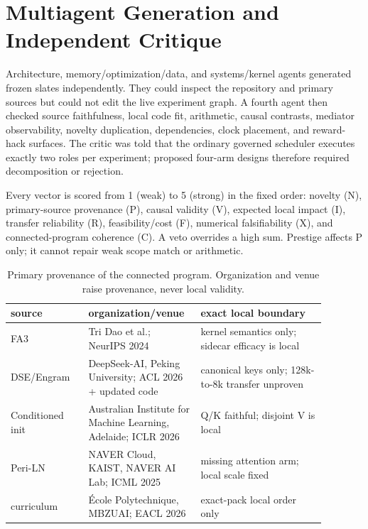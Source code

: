 \documentclass{article}
\begin{document}
\section{Multiagent Generation and Independent Critique}

Architecture, memory/optimization/data, and systems/kernel agents generated
frozen slates independently.  They could inspect the repository and primary
sources but could not edit the live experiment graph.  A fourth agent then
checked source faithfulness, local code fit, arithmetic, causal contrasts,
mediator observability, novelty duplication, dependencies, clock placement,
and reward-hack surfaces.  The critic was told that the ordinary governed
scheduler executes exactly two roles per experiment; proposed four-arm
designs therefore required decomposition or rejection.

Every vector is scored from 1 (weak) to 5 (strong) in the fixed order:
novelty (N), primary-source provenance (P), causal validity (V), expected
local impact (I), transfer reliability (R), feasibility/cost (F), numerical
falsifiability (X), and connected-program coherence (C).  A veto overrides a
high sum.  Prestige affects P only; it cannot repair weak scope match or
arithmetic.

\begin{table}[t]
\caption{Primary provenance of the connected program.  Organization and
venue raise provenance, never local validity.}
\label{tab:provenance}
\centering\tiny
\setlength{\tabcolsep}{1.5pt}
\begin{tabular}{p{0.23\linewidth}p{0.28\linewidth}p{0.37\linewidth}}
\toprule
source & organization/venue & exact local boundary\\
\midrule
FA3 & Tri Dao et al.; NeurIPS 2024 & kernel semantics only; sidecar efficacy is local\\
DSE/Engram & DeepSeek-AI, Peking University; ACL 2026 + updated code & canonical keys only; 128k-to-8k transfer unproven\\
Conditioned init & Australian Institute for Machine Learning, Adelaide; ICLR 2026 & Q/K faithful; disjoint V is local\\
Peri-LN & NAVER Cloud, KAIST, NAVER AI Lab; ICML 2025 & missing attention arm; local scale fixed\\
curriculum & École Polytechnique, MBZUAI; EACL 2026 & exact-pack local order only\\
\bottomrule
\end{tabular}
\end{table}
\end{document}
